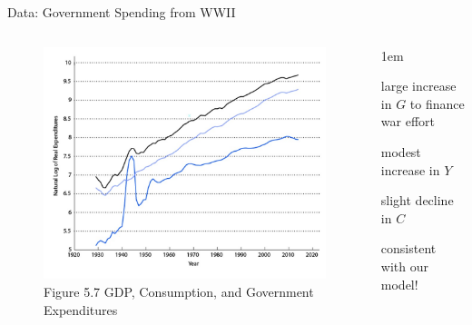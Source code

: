 \documentclass[11pt,aspectratio=43]{beamer}
\let\olditemize=\itemize
\let\endolditemize=\enditemize
\renewenvironment{itemize}{\olditemize \itemsep1em}{\endolditemize}
\theoremstyle{definition}
\begin{document}
\begin{frame}{Data: Government Spending from WWII}
\label{slide:Data__Government_Spending_from_WWII}
    \begin{columns}
        \begin{column}{0.5\textwidth}
            \begin{figure}
                \caption{\scriptsize Figure 5.7  GDP, Consumption, and Government Expenditures}
                \includegraphics[width=\textwidth]{./figures/Figure5_7.jpg}
            \end{figure}
        \end{column}
        \begin{column}{0.5\textwidth}
            \begin{itemize}
                \item large increase in $ G $ to finance war effort
                \item modest increase in $ Y $
                \item slight decline in $ C $
                \item consistent with our model!
            \end{itemize}
        \end{column}
    \end{columns}
\end{frame}
\end{document}
